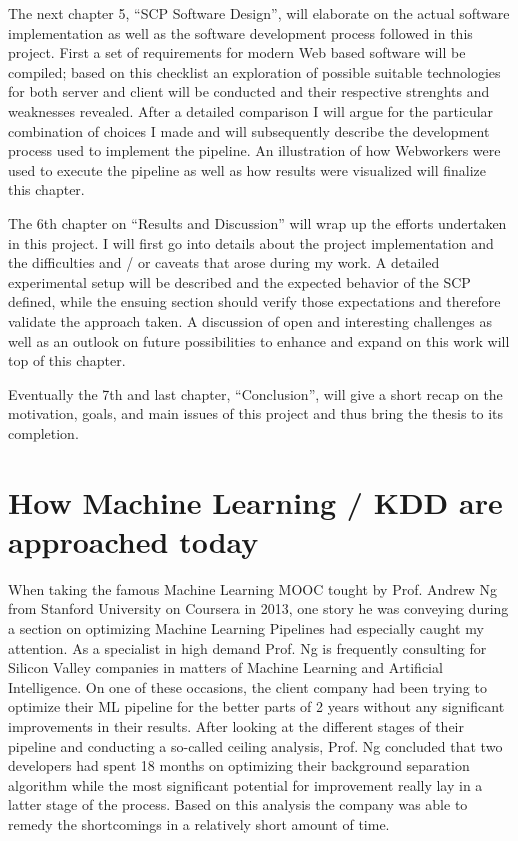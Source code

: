 \par

The next chapter 5, ``SCP Software Design'', will elaborate on the actual software implementation as well as the software development process followed in this project. First a set of requirements for modern Web based software will be compiled; based on this checklist an exploration of possible suitable technologies for both server and client will be conducted and their respective strenghts and weaknesses revealed. After a detailed comparison I will argue for the particular combination of choices I made and will subsequently describe the development process used to implement the pipeline. An illustration of how Webworkers were used to execute the pipeline as well as how results were visualized will finalize this chapter.

\par

The 6th chapter on ``Results and Discussion'' will wrap up the efforts undertaken in this project. I will first go into details about the project implementation and the difficulties and / or caveats that arose during my work. A detailed experimental setup will be described and the expected behavior of the SCP defined, while the ensuing section should verify those expectations and therefore validate the approach taken. A discussion of open and interesting challenges as well as  an outlook on future possibilities to enhance and expand on this work will top of this chapter.

\par 

Eventually the 7th and last chapter, ``Conclusion'', will give a short recap on the motivation, goals, and main issues of this project and thus bring the thesis to its completion.



\section{How Machine Learning / KDD are approached today}
\label{sect:ml_kdd_today}

When taking the famous Machine Learning MOOC tought by Prof. Andrew Ng from Stanford University on Coursera in 2013, one story he was conveying during a section on optimizing Machine Learning Pipelines had especially caught my attention. As a specialist in high demand Prof. Ng is frequently consulting for Silicon Valley companies in matters of Machine Learning and Artificial Intelligence. On one of these occasions, the client company had been trying to optimize their ML pipeline for the better parts of 2 years without any significant improvements in their results. After looking at the different stages of their pipeline and conducting a so-called ceiling analysis, Prof. Ng concluded that two developers had spent 18 months on optimizing their background separation algorithm while the most significant potential for improvement really lay in a latter stage of the process. Based on this analysis the company was able to remedy the shortcomings in a relatively short amount of time.

